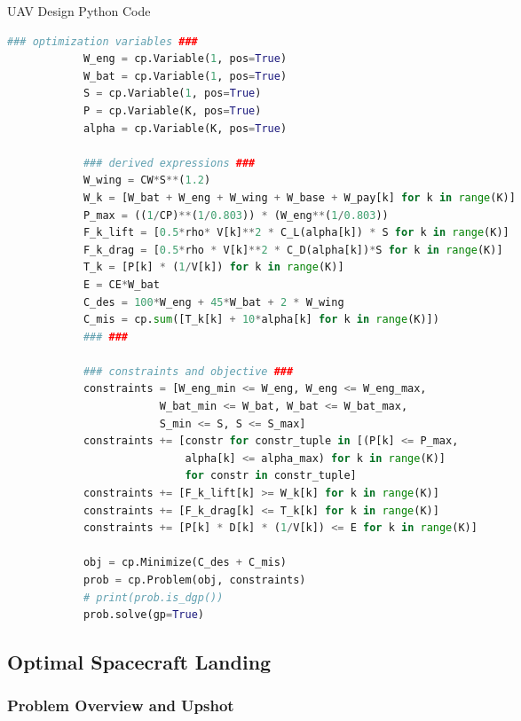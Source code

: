 \documentclass[12pt,reqno]{article}
\theoremstyle{definition}
\numberwithin{equation}{section}
\begin{document}
    \begin{algorithm}[H]
        \caption{UAV Design Python Code}
        \centering
            \begin{lstlisting}[language=Python]
            ### optimization variables ###
            W_eng = cp.Variable(1, pos=True)
            W_bat = cp.Variable(1, pos=True)
            S = cp.Variable(1, pos=True)
            P = cp.Variable(K, pos=True)
            alpha = cp.Variable(K, pos=True)
            
            ### derived expressions ###
            W_wing = CW*S**(1.2)
            W_k = [W_bat + W_eng + W_wing + W_base + W_pay[k] for k in range(K)]
            P_max = ((1/CP)**(1/0.803)) * (W_eng**(1/0.803))
            F_k_lift = [0.5*rho* V[k]**2 * C_L(alpha[k]) * S for k in range(K)]
            F_k_drag = [0.5*rho * V[k]**2 * C_D(alpha[k])*S for k in range(K)]
            T_k = [P[k] * (1/V[k]) for k in range(K)]
            E = CE*W_bat
            C_des = 100*W_eng + 45*W_bat + 2 * W_wing
            C_mis = cp.sum([T_k[k] + 10*alpha[k] for k in range(K)])
            ### ###
            
            ### constraints and objective ###
            constraints = [W_eng_min <= W_eng, W_eng <= W_eng_max,
                        W_bat_min <= W_bat, W_bat <= W_bat_max,
                        S_min <= S, S <= S_max]
            constraints += [constr for constr_tuple in [(P[k] <= P_max,
                            alpha[k] <= alpha_max) for k in range(K)]
                            for constr in constr_tuple]
            constraints += [F_k_lift[k] >= W_k[k] for k in range(K)]
            constraints += [F_k_drag[k] <= T_k[k] for k in range(K)]
            constraints += [P[k] * D[k] * (1/V[k]) <= E for k in range(K)]
            
            obj = cp.Minimize(C_des + C_mis)
            prob = cp.Problem(obj, constraints)
            # print(prob.is_dgp())
            prob.solve(gp=True)
            \end{lstlisting}
        \label{alg:uav_code}
    \end{algorithm}

\subsection{Optimal Spacecraft Landing}

\subsubsection*{Problem Overview and Upshot}
\end{document}
